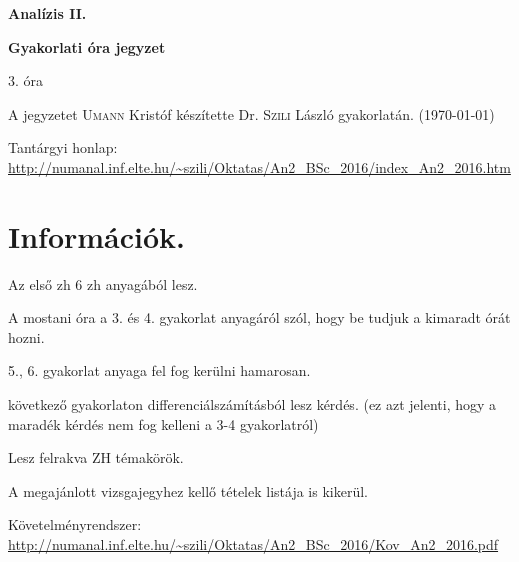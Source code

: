 \documentclass[a4paper,11.5pt]{article}
\begin{document}
	\setlength\parindent{0pt}
	\def\s{\hspace{0.2mm}\vphantom{\beta}}
	\def\Z{\mathbb{Z}}
	\def\Q{\mathbb{Q}}
	\def\R{\mathbb{R}}
	\def\C{\mathbb{C}}
	\def\N{\mathbb{N}}
	\def\Rn{\mathbb{R}^{n}}
	\def\Ra{\overline{\mathbb{R}}}
	\def\sume{\displaystyle\sum_{n=1}^{+\infty}}
	\def\sumn{\displaystyle\sum_{n=0}^{+\infty}}
	\def\biz{\emph{Bizonyítás:\ }}
	\def\narrow{\underset{n\rightarrow+\infty}{\longrightarrow}}
	\def\limn{\displaystyle\lim_{n\to +\infty}}
	\def\limx{\displaystyle\lim_{x\to +\infty}}
	
	\theoremstyle{definition}
	\newtheorem{theorem}{Tétel}[subsection] %
	
	\theoremstyle{definition}
	\newtheorem{definition}[theorem]{Definíció} %
	\newtheorem{example}[theorem]{Példa} %
	\newtheorem{task}[theorem]{Feladat} %
	\newtheorem{note}[theorem]{Megjegyzés} %
	\newtheorem{revision}[theorem]{Emlékeztető} %
	\begin{center}
		{\LARGE \textbf{Analízis II.}}
		
		{\large \textbf{Gyakorlati óra jegyzet}}
		
		3. óra
	\end{center}
	A jegyzetet \textsc{Umann} Kristóf készítette Dr. \textsc{Szili} László gyakorlatán. (\today)
	
	Tantárgyi honlap: \url{http://numanal.inf.elte.hu/~szili/Oktatas/An2_BSc_2016/index_An2_2016.htm}
	\section{Információk.}
	\begin{compactenum}
		\item Az első zh 6 zh anyagából lesz.
		\item A mostani óra a 3. és 4. gyakorlat anyagáról szól, hogy be tudjuk a kimaradt órát hozni.
		\item 5., 6. gyakorlat anyaga fel fog kerülni hamarosan.
		\item következő gyakorlaton differenciálszámításból lesz kérdés. (ez azt jelenti, hogy a maradék kérdés nem fog kelleni a 3-4 gyakorlatról)
		\item Lesz felrakva ZH témakörök. 
		\item A megajánlott vizsgajegyhez kellő tételek listája is kikerül.
	\end{compactenum}
	Követelményrendszer: \url{http://numanal.inf.elte.hu/~szili/Oktatas/An2_BSc_2016/Kov_An2_2016.pdf}
\end{document}
